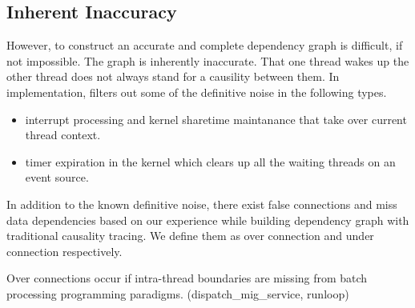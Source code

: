 \subsection{Inherent Inaccuracy}\label{subsec:inherentinaccuracy}

However, to construct an accurate and complete dependency graph is difficult,
if not impossible. The graph is inherently inaccurate. That one thread wakes
up the other thread does not always stand for a causility between them. In
implementation, \xxx filters out some of the definitive noise in the following
types.


\begin{itemize}

\item interrupt processing and kernel sharetime maintanance that take over
current thread context.

\item timer expiration in the kernel which clears up all the waiting threads on
an event source.

\end{itemize}

In addition to the known definitive noise, there exist false connections and
miss data dependencies based on our experience while building dependency graph
with traditional causality tracing. We define them as over connection and under
connection respectively.

Over connections occur if intra-thread boundaries are missing from batch
processing programming paradigms. (dispatch\_mig\_service, runloop)

